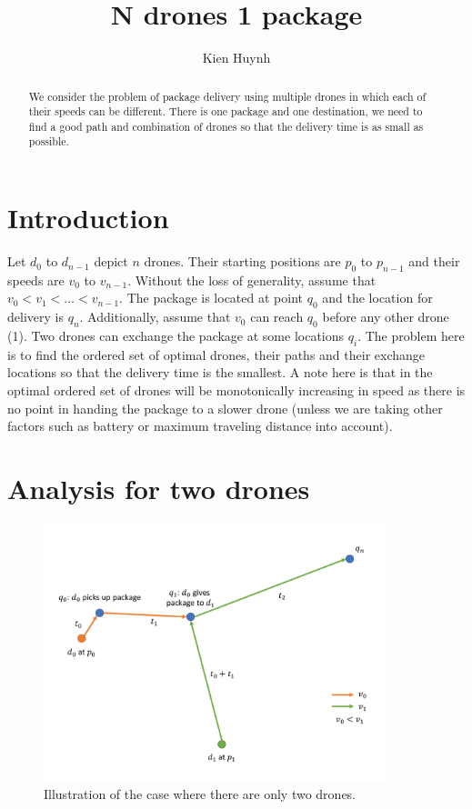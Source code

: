 \documentclass[]{article}
\title{N drones 1 package}
\author{Kien Huynh}
\begin{document}
\maketitle

\begin{abstract}

We consider the problem of package delivery using multiple drones in which each of their speeds can be different. There is one package and one destination, we need to find a good path and combination of drones so that the delivery time is as small as possible.

\end{abstract}

\section{Introduction}

Let $d_0$ to $d_{n-1}$ depict $n$ drones. Their starting positions are $p_0$ to $p_{n-1}$ and their speeds are $v_0$ to $v_{n-1}$. Without the loss of generality, assume that $v_0 < v_1 < ... < v_{n-1}$. The package is located at point $q_0$ and the location for delivery is $q_n$. Additionally, assume that $v_0$ can reach $q_0$ before any other drone (1). Two drones can exchange the package at some locations $q_i$. The problem here is to find the ordered set of optimal drones, their paths and their exchange locations so that the delivery time is the smallest. A note here is that in the optimal ordered set of drones will be monotonically increasing in speed as there is no point in handing the package to a slower drone (unless we are taking other factors such as battery or maximum traveling distance into account).

\section{Analysis for two drones}

\begin{figure}[!h]
	\centering
	\includegraphics[width=10cm]{figures/2drones.pdf}
	\caption{Illustration of the case where there are only two drones.}
	\label{fig:2drone}
\end{figure}
\end{document}
